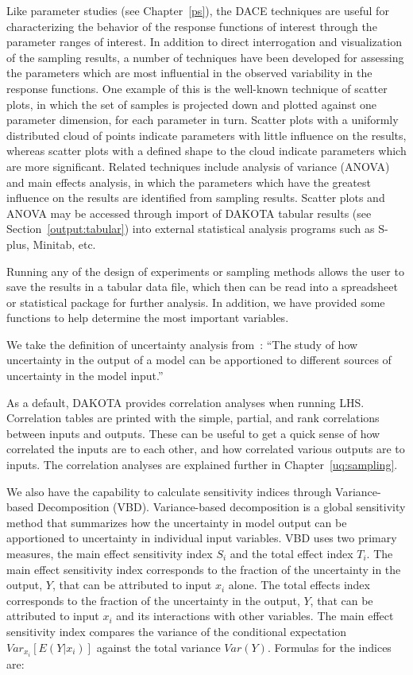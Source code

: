 Like parameter studies (see Chapter~\ref{ps}), the DACE techniques are
useful for characterizing the behavior of the response functions of
interest through the parameter ranges of interest. In addition to
direct interrogation and visualization of the sampling results, a
number of techniques have been developed for assessing the parameters
which are most influential in the observed variability in the response
functions. One example of this is the well-known technique of scatter
plots, in which the set of samples is projected down and plotted
against one parameter dimension, for each parameter in turn. Scatter
plots with a uniformly distributed cloud of points indicate parameters
with little influence on the results, whereas scatter plots with a
defined shape to the cloud indicate parameters which are more
significant. Related techniques include analysis of variance
(ANOVA)~\cite{Mye95} and main effects analysis, in which the parameters
which have the greatest influence on the results are identified from
sampling results. Scatter plots and ANOVA may be accessed through
import of DAKOTA tabular results (see Section~\ref{output:tabular})
into external statistical analysis programs such as S-plus, Minitab,
etc.

Running any of the design of experiments or sampling methods allows
the user to save the results in a tabular data file, which then can be
read into a spreadsheet or statistical package for further analysis.
In addition, we have provided some functions to help determine the
most important variables.

We take the definition of uncertainty analysis from~\cite{Sal04}: 
``The study of how uncertainty in the output of a model can be 
apportioned to different sources of uncertainty in the model input.''

As a default, DAKOTA provides correlation analyses when running LHS.
Correlation tables are printed with the simple, partial, and rank
correlations between inputs and outputs. These can be useful to get a
quick sense of how correlated the inputs are to each other, and how
correlated various outputs are to inputs. The correlation analyses are
explained further in Chapter~\ref{uq:sampling}.

We also have the capability to calculate sensitivity indices through
Variance-based Decomposition (VBD). Variance-based decomposition 
is a global sensitivity method that summarizes how the uncertainty 
in model output can be apportioned to uncertainty in individual 
input variables.  VBD uses two primary measures, the main effect 
sensitivity index $S_{i}$ and the total effect index $T_{i}$.  The 
main effect sensitivity 
index corresponds to the fraction of the uncertainty in the output, $Y$, 
that can be attributed to input $x_{i}$ alone.  The total effects index 
corresponds to the fraction of the uncertainty in 
the output, $Y$, that can be attributed to input $x_{i}$ and its 
interactions with other variables. The main effect sensitivity index
compares the variance of the conditional expectation
$Var_{x_{i}}[E(Y|x_{i})]$ against the total variance $Var(Y)$.
Formulas for the indices are: 


